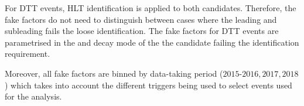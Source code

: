 For DTT events, HLT \tauhadvis identification is applied to both \tauhadvis
candidates. Therefore, the fake factors do not need to distinguish between cases
where the leading and subleading \tauhadvis fails the loose identification. The
fake factors for DTT events are parametrised in the \pT and decay mode of the
the \tauhadvis candidate failing the identification requirement.

Moreover, all fake factors are binned by data-taking period (${\text{2015-2016},
  \text{2017}, \text{2018}}$) which takes into account the different triggers
being used to select events used for the analysis.




